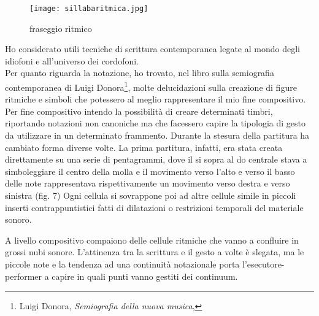 
\begin{figure}[htbp]
\begin{center}
\texttt{[image: sillabaritmica.jpg]}
\caption{fraseggio ritmico}
\label{default}
\end{center}

\end{figure}

Ho considerato utili tecniche di scrittura contemporanea legate al mondo degli idiofoni e all'universo dei cordofoni. \\
Per quanto riguarda la notazione, ho trovato, nel libro sulla semiografia contemporanea di Luigi Donora\footnote{Luigi Donora, \textit{Semiografia della nuova musica}, }, molte delucidazioni sulla creazione di figure ritmiche e simboli che potessero al meglio rappresentare il mio fine compositivo. Per fine compositivo intendo la possibilità di creare determinati timbri, riportando notazioni non canoniche ma che facessero capire la tipologia di gesto da utilizzare in un determinato frammento. Durante la stesura della partitura ha cambiato forma diverse volte. La prima partitura, infatti, era stata creata direttamente su una serie di pentagrammi, dove il si sopra al do centrale stava a simboleggiare il centro della molla e il movimento verso l'alto e verso il basso delle note rappresentava rispettivamente un movimento verso destra e verso sinistra (fig. 7)
Ogni cellula si sovrappone poi ad altre cellule simile in piccoli inserti contrappuntistici fatti di dilatazioni o restrizioni temporali del materiale sonoro.

A livello compositivo compaiono delle cellule ritmiche che vanno a confluire in grossi nubi sonore. L'attinenza tra la scrittura e il gesto a volte è slegata, ma le piccole note e la tendenza ad una continuità notazionale porta l'esecutore-performer a capire in quali punti vanno gestiti dei continuum.

